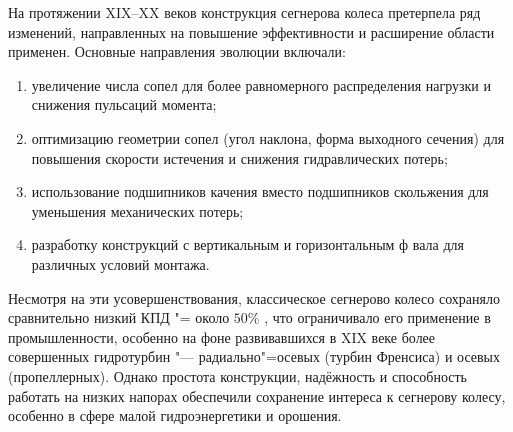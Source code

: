 На протяжении XIX--XX веков конструкция сегнерова колеса претерпела ряд изменений, направленных на повышение эффективности и расширение области применен. Основные направления эволюции включали:
\begin{enumerate}
    \renewcommand{\labelenumi}{\arabic{enumi})}
    \item увеличение числа сопел для более равномерного распределения нагрузки и снижения пульсаций момента;
    \item оптимизацию геометрии сопел (угол наклона, форма выходного сечения) для повышения скорости истечения и снижения гидравлических потерь;
    \item использование подшипников качения вместо подшипников скольжения для уменьшения механических потерь;
    \item разработку конструкций с вертикальным и горизонтальным ф вала для различных условий монтажа.
\end{enumerate}

Несмотря на эти усовершенствования, классическое сегнерово колесо сохраняло сравнительно низкий КПД "= около $50\%$ \cite{konchakov}, что ограничивало его применение в промышленности, особенно на фоне развивавшихся в XIX веке более совершенных гидротурбин "--- радиально"=осевых (турбин Френсиса) и осевых (пропеллерных). Однако простота конструкции, надёжность и способность работать на низких напорах обеспечили сохранение интереса к сегнерову колесу, особенно в сфере малой гидроэнергетики и орошения.	

